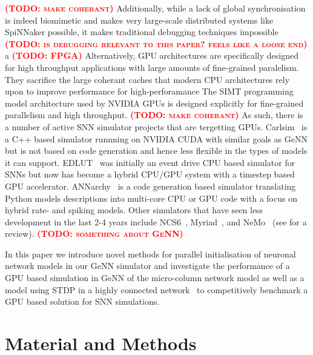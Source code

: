 \documentclass[utf8]{frontiersSCNS} %
\newcommand{\todo}[1]{\textbf{\textsc{\textcolor{red}{(TODO: #1)}}}}
\begin{document}
\todo{make coherant}
Additionally, while a lack of global synchronisation is indeed biomimetic and makes very large-scale distributed systems like SpiNNaker possible, it makes traditional debugging techniques impossible \todo{is debugging relevant to this paper? feels like a loose end} a
\todo{FPGA}
Alternatively, GPU architectures are specifically designed for high throughput applications with large amounts of fine-grained paralelism.
They sacrifice the large coherant caches that modern CPU architectures rely upon to improve performance for high-perforamance
The SIMT programming model architecture used by NVIDIA GPUs is designed explicitly for fine-grained parallelism and high throughput.
\todo{make coherant}
As such, there is a number of active SNN simulator projects that are tergetting GPUs. Carlsim~\citep{Chou2018} is a C++ based simulator runnning on NVIDIA CUDA with similar goals as GeNN but is not based on code generation and hence less flexible in the types of models it can support.
EDLUT~\citep{Garrido2011} was initially an event drive CPU based simulator for SNNs but now has become a hybrid CPU/GPU system with a timestep based GPU accelerator.
ANNarchy~\citep{Vitay2015} is a code generation based simulator translating Python models descriptions into multi-core CPU or GPU code with a focus on hybrid rate- and spiking models.
Other simulators that have seen less development in the last 2-4 years include NCS6~\citep{Hoang2013}, Myriad~\citep{Rittner2016}, and NeMo~\citep{Fidjeland2009} (see \citet{Brette2012} for a review).
\todo{something about GeNN}

In this paper we introduce novel methods for parallel initialisation of neuronal network models in our GeNN simulator and investigate the performance of a GPU based simulation in GeNN of the micro-column network model \cite{Potjans2012,VanAlbada2018} as well as a model using STDP in a highly connected network~\citep{Morrison2007} to competitively benchmark a GPU based solution for SNN simulations.

\section{Material and Methods}
\label{sec:method}
\end{document}

